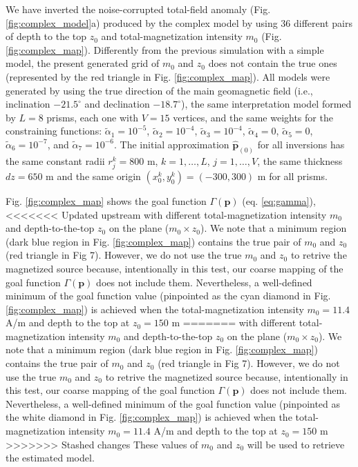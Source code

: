 We have inverted the noise-corrupted total-field anomaly (Fig. \ref{fig:complex_model}a) produced by the complex model by using 36 different pairs of depth to the top $ z_0 $
and total-magnetization intensity $ m_0 $ (Fig. \ref{fig:complex_map}). Differently from the previous simulation with a simple model, the present generated grid of $ m_0 $ and $ z_0 $ does not contain the true ones (represented by the red triangle in Fig. \ref{fig:complex_map}). All models were generated by using the true direction of the main geomagnetic field (i.e., inclination $ -21.5^\circ $ and declination $ -18.7^\circ $), the same interpretation model formed by $ L = 8 $ prisms, each one with $ V = 15 $ vertices, and the same weights for the constraining functions: $\tilde{\alpha}_1 = 10^{-5}$, $\tilde{\alpha}_2 = 10^{-4}$, $\tilde{\alpha}_3 = 10^{-4}$, $\tilde{\alpha}_4 = 0$, $\tilde{\alpha}_5 = 0$, $\tilde{\alpha}_6 = 10^{-7}$, and $\tilde{\alpha}_7 = 10^{-6}$. The initial approximation $ \hat{\mathbf{p}}_{(0)} $ for all inversions has the same constant radii $ r^k_j = 800 $ m, $ k = 1, \dots, L $, $ j = 1, \dots, V $, the same thickness $ dz = 650 $ m and the same origin $ (x^k_0, y^k_0) = (-300, 300) $ m for all prisms.

Fig. \ref{fig:complex_map} shows the goal function $ \Gamma(\mathbf{p}) $ (eq. \ref{eq:gamma}),
<<<<<<< Updated upstream
with different total-magnetization intensity $ m_0 $ and depth-to-the-top $z_0$ on the plane ($ m_0 \times z_0 $). We note that a minimum region (dark blue region in Fig. \ref{fig:complex_map}) contains the true pair of $ m_0 $ and  $ z_0 $  (red triangle  in Fig 7). However, we do not use the true  $ m_0 $ and $ z_0 $ to retrive the magnetized source because, intentionally in this test, our coarse mapping of the goal function $ \Gamma(\mathbf{p}) $ does not  include them.  Nevertheless, a well-defined minimum of the goal function value (pinpointed as the cyan diamond in Fig. \ref{fig:complex_map}) is achieved when the total-magnetization intensity $ m_0 = 11.4 $ A/m and depth to the top at $  z_0 = 150 $ m
=======
with different total-magnetization intensity $ m_0 $ and depth-to-the-top $z_0$ on the plane ($ m_0 \times z_0 $). We note that a minimum region (dark blue region in Fig. \ref{fig:complex_map}) contains the true pair of $ m_0 $ and  $ z_0 $  (red triangle  in Fig 7). However, we do not use the true  $ m_0 $ and $ z_0 $ to retrive the magnetized source because, intentionally in this test, our coarse mapping of the goal function $ \Gamma(\mathbf{p}) $ does not  include them.  Nevertheless, a well-defined minimum of the goal function value (pinpointed as the white diamond in Fig. \ref{fig:complex_map}) is achieved when the total-magnetization intensity $ m_0 = 11.4 $ A/m and depth to the top at $  z_0 = 150 $ m
>>>>>>> Stashed changes
These values of $ m_0 $ and $ z_0 $ will be used to retrieve the estimated model.

